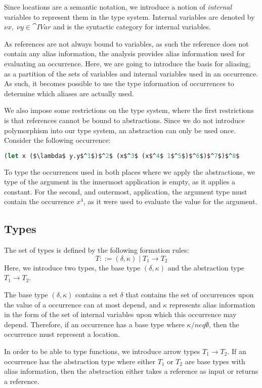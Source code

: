 \documentclass[acmsmall,sigplan]{acmart}
\begin{document}
Since locations are a semantic notation, we introduce a notion of
\emph{internal} variables to represent them in the type
system. Internal variables are denoted by
$\nu x,\; \nu y\in\cat{IVar}$ and  is the syntactic category
for internal variables.

As references are not always bound to variables, as such the reference
does not contain any alias information, the analysis provides alias
information used for evaluating an occurrence.  Here, we are going to
introduce the basis for aliasing, as a partition of the sets of
variables and internal variables used in an occurrence.  As such, it
becomes possible to use the type information of occurrences to
determine which aliases are actually used.

We also impose some restrictions on the type system, where the first
restrictions is that references cannot be bound to abstractions.
Since we do not introduce polymorphism into our type system, an abstraction can only be
used once. 
Consider the following occurrence:
\begin{lstlisting}[language=Caml, mathescape=true]
(let x ($\lambda$ y.y$^1$)$^2$ (x$^3$ (x$^4$ 1$^5$)$^6$)$^7$)$^8$
\end{lstlisting}
To type the occurrences used in both places where we apply the
abstractions, we type of the argument in the innermost application is
empty, as it applies a constant. 
For the second, and outermost, application, the argument type must
contain the occurrence $x^4$, as it were used to evaluate the value
for the argument. 

\subsection{Types}\label{sec:types}

The set of types  is defined by the following formation rules:
%
\[ T ::=(\delta,\kappa)\mid T_1 \rightarrow T_2 \]
%
Here, we introduce two types, the base type $(\delta,\kappa)$ and the
abstraction type $T_1 \rightarrow T_2$.

The base type $(\delta,\kappa)$ contains a set $\delta$ that contains
the set of occurrences upon the value of a occurrence can at most
depend, and $\kappa$ represents alias information in the form of the
set of internal variables upon which this occurrence may
depend. Therefore, if an occurrence has a base type where
$\kappa/neq \emptyset$, then the occurrence must represent a location.

In order to be able to type functions, we introduce arrow types
$T_1 \rightarrow T_2$. If an occurrence has the
abstraction type where either $T_1$ or $T_2$ are base types with alias
information, then the abstraction either takes a reference as input or
returns a reference.
\end{document}
